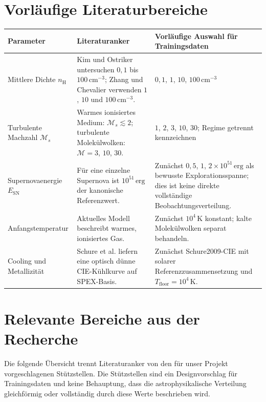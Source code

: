 \documentclass[11pt,a4paper]{article}
\begin{document}
\section{Vorläufige Literaturbereiche}

\begin{tabularx}{\textwidth}{p{3.5cm}p{4.0cm}Y}
\toprule
Parameter & Literaturanker & Vorläufige Auswahl für Trainingsdaten \\
\midrule
Mittlere Dichte $n_{\mathrm H}$ & Kim und Ostriker untersuchen $0{,}1$ bis $100\,\mathrm{cm}^{-3}$; Zhang und Chevalier verwenden $1$, $10$ und $100\,\mathrm{cm}^{-3}$. & $0{,}1$, $1$, $10$, $100\,\mathrm{cm}^{-3}$ \\
\addlinespace
Turbulente Machzahl $\mathcal M_s$ & Warmes ionisiertes Medium: $\mathcal M_s\lesssim2$; turbulente Molekülwolken: $\mathcal M=3$, $10$, $30$. & $1$, $2$, $3$, $10$, $30$; Regime getrennt kennzeichnen \\
\addlinespace
Supernovaenergie $E_{\mathrm{SN}}$ & Für eine einzelne Supernova ist $10^{51}\,\mathrm{erg}$ der kanonische Referenzwert. & Zunächst $0{,}5$, $1$, $2\times10^{51}\,\mathrm{erg}$ als bewusste Explorationsspanne; dies ist keine direkte vollständige Beobachtungsverteilung. \\
\addlinespace
Anfangstemperatur & Aktuelles Modell beschreibt warmes, ionisiertes Gas. & Zunächst $10^4\,\mathrm K$ konstant; kalte Molekülwolken separat behandeln. \\
\addlinespace
Cooling und Metallizität & Schure et al. liefern eine optisch dünne CIE-Kühlkurve auf SPEX-Basis. & Zunächst Schure2009-CIE mit solarer Referenzzusammensetzung und $T_{\mathrm{floor}}=10^4\,\mathrm K$. \\
\bottomrule
\end{tabularx}

\section{Relevante Bereiche aus der Recherche}

Die folgende Übersicht trennt Literaturanker von den für unser Projekt
vorgeschlagenen Stützstellen. Die Stützstellen sind ein Designvorschlag für
Trainingsdaten und keine Behauptung, dass die astrophysikalische Verteilung
gleichförmig oder vollständig durch diese Werte beschrieben wird.
\end{document}
